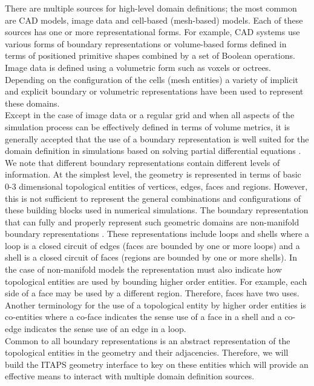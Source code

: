 \documentclass{article}
\begin{document}
There are multiple sources for high-level domain definitions; 
the most common are CAD models, image data and cell-based (mesh-based) 
models. Each of these sources has one or more representational 
forms. For example, CAD systems use various forms of boundary 
representations or volume-based forms defined in terms of positioned 
primitive shapes combined by a set of Boolean operations. Image 
data is defined using a volumetric form such as voxels or octrees. 
Depending on the configuration of the cells (mesh entities) a 
variety of implicit and explicit boundary or volumetric representations 
have been used to represent these domains.\\


Except in the case of image data or a regular grid and when 
all aspects of the simulation process can be effectively defined 
in terms of volume metrics, it is generally accepted that the 
use of a boundary representation is well suited for the domain 
definition in simulations based on solving partial differential 
equations \cite{r3, r19, r21, r25}. We note that different boundary representations 
contain different levels of information. At the simplest level, 
the geometry is represented in terms of basic 0-3 dimensional 
topological entities of vertices, edges, faces and regions. However, 
this is not sufficient to represent the general combinations 
and configurations of these building blocks used in numerical 
simulations. The boundary representation that can fully and properly 
represent such geometric domains are non-manifold boundary representations 
\cite{r8, r29}. These representations include loops and shells where 
a loop is a closed circuit of edges (faces are bounded by one 
or more loops) and a shell is a closed circuit of faces (regions 
are bounded by one or more shells). In the case of non-manifold 
models the representation must also indicate how topological 
entities are used by bounding higher order entities. For example, 
each side of a face may be used by a different region. Therefore, 
faces have two uses. Another terminology for the use of a topological 
entity by higher order entities is co-entities  \cite{r25} where a 
co-face indicates the sense use of a face in a shell and a co-edge 
indicates the sense use of an edge in a loop. \\


Common to all boundary representations is an abstract representation 
of the topological entities in the geometry and their adjacencies. 
Therefore, we will build the ITAPS geometry interface to key on 
these entities which will provide an effective means to interact 
with multiple domain definition sources. \\
\end{document}
